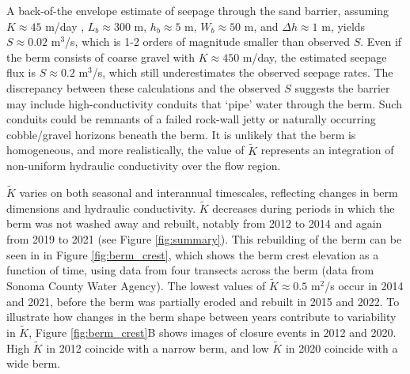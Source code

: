 \documentclass[preprint,12pt,authoryear]{elsarticle}
\begin{document}
A back-of-the envelope estimate of seepage through the  sand barrier, assuming $K \approx 45$ m/day \citep[sand,][]{masters1991introduction}, $L_b \approx 300$ m, $h_b \approx 5$ m, $W_b \approx 50$ m, and $\Delta h \approx 1$ m, yields $S \approx 0.02$ m$^3$/s, which is 1-2 orders of magnitude smaller than observed $S$.  Even if the berm consists of coarse gravel with $K \approx 450$ m/day, the estimated seepage flux is  $S \approx 0.2$ m$^3$/s, which still underestimates the observed seepage rates.
The discrepancy between these calculations and the observed $S$ suggests the barrier may include high-conductivity conduits that `pipe' water through the berm.
Such conduits could be remnants of a failed rock-wall jetty \citep{behrens2009characterization} or naturally occurring cobble/gravel horizons beneath the berm.  It is unlikely that the berm is homogeneous, and more realistically, the value of $\tilde K$ represents an integration of non-uniform hydraulic conductivity over the flow region. 

 $\tilde{K}$ varies on both seasonal and interannual timescales, reflecting changes in berm dimensions and hydraulic conductivity.
$\tilde K$ decreases during periods in which the berm was not washed away and rebuilt, notably from 2012 to 2014 and again from 2019 to 2021 (see Figure \ref{fig:summary}).  This rebuilding of the berm can be seen in in Figure \ref{fig:berm_crest}, which shows the berm crest elevation as a function of time, using data from four transects across the berm (data from Sonoma County Water Agency).  The lowest values of $\tilde K \approx0.5$ m$^2$/s occur in 2014 and 2021, before the berm was partially eroded and rebuilt in 2015 and 2022.
To illustrate how changes in the berm shape between years  contribute to variability in $\tilde K$,  Figure \ref{fig:berm_crest}B shows images of closure events in 2012 and 2020.  High $\tilde K$ in 2012 coincide with a narrow berm, and low $\tilde K$ in 2020 coincide with a wide berm. 
 
\end{document}
